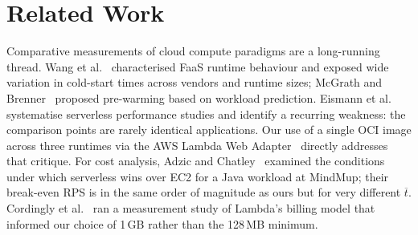 \section{Related Work}
\label{sec:related}

Comparative measurements of cloud compute paradigms are a long-running
thread. Wang et al.~\cite{peeking-serverless} characterised FaaS
runtime behaviour and exposed wide variation in cold-start times across
vendors and runtime sizes; McGrath and Brenner~\cite{mcgrath-faas}
proposed pre-warming based on workload prediction.
Eismann et al.~\cite{eismann2021review} systematise serverless
performance studies and identify a recurring weakness: the comparison
points are rarely identical applications. Our use of a single OCI
image across three runtimes via the AWS Lambda Web
Adapter~\cite{lambda-web-adapter} directly addresses that critique.
For cost analysis, Adzic and Chatley~\cite{adzic-serverless} examined
the conditions under which serverless wins over EC2 for a Java
workload at MindMup; their break-even RPS is in the same order of
magnitude as ours but for very different $\overline{t}$. Cordingly et
al.~\cite{cordingly2020lambda} ran a measurement study of Lambda's
billing model that informed our choice of 1\,GB rather than the
128\,MB minimum.
